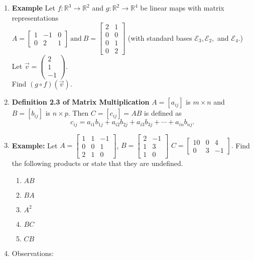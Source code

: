 \documentclass[11pt,fleqn]{article}
\begin{document}
\renewcommand{\headrulewidth}{0pt}
\newcommand{\blank}[1]{\rule{#1}{0.75pt}}
\renewcommand{\d}{\displaystyle}

\newcommand{\bpm}{\begin{pmatrix}}
\newcommand{\epm}{\end{pmatrix}}
\newcommand{\bbm}{\begin{bmatrix}}
\newcommand{\ebm}{\end{bmatrix}}

\vspace*{-0.7in}

\begin{center}
  \large {}
\end{center}

\begin{enumerate}
\item \textbf{Example} Let $f: \mathbb{R}^3 \to \mathbb{R}^2$ and $g:\mathbb{R}^2 \to \mathbb{R}^4$ be linear maps with matrix representations \\

$A=\bbm  1&-1&0 \\ 0& 2& 1\ebm \: \text{and} \: B=\bbm 2& 1 \\ 0&0 \\ 0 & 1 \\ 0 & 2 \ebm$ (with standard bases $\mathcal{E}_3,\mathcal{E}_2,$ and
$\mathcal{E}_4.$) Let $\vec{v}=\bpm 2\\1\\-1 \epm.$ \\ Find $(g \circ f)(\vec{v}).$
\vfill
\item \textbf{Definition 2.3 of Matrix Multiplication} $A=[a_{ij}]$ is $m \times n$ and $B=[b_{ij}]$ is $n \times p.$ Then $C=[c_{ij}]=AB$ is defined as $$c_{ij}=a_{i1}b_{1j}+a_{i2}b_{2j}+a_{i3}b_{3j}+\cdots +a_{in}b_{nj}.$$
\vfill
\newpage


\item \textbf{Example:} Let $A=\bbm 1&1&-1 \\ 0&0&1\\ 2 & 1&0  \ebm$, $B=\bbm 2&-1 \\ 1&3 \\ 1&0\ebm$ $C=\bbm 10 & 0 & 4 \\ 0&3&-1 \ebm.$ Find the following products or state that they are undefined.
\begin{enumerate}
	\item $AB$
	\vfill
	\item $BA$
	\vfill
	\item $A^2$
	\vfill
	\item $BC$
	\vfill
	\item $CB$
	\vfill
\end{enumerate}
\item Observations:
\vspace{2in}
\end{enumerate}
\end{document}
